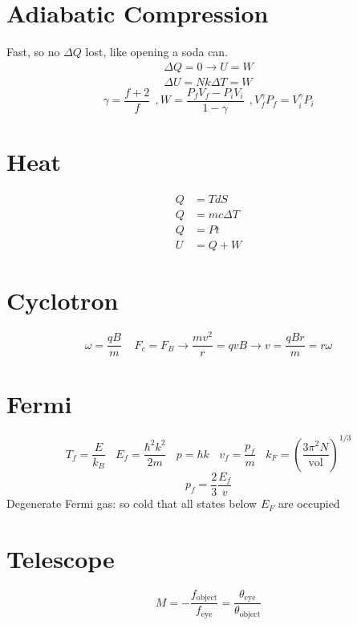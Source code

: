 \documentclass[10pt,letter]{article}
\begin{document}
\section{Adiabatic Compression} %
\label{sec:adiabatic_compression}
Fast, so no $\Delta Q$ lost, like opening a soda can.
\begin{align}
    \Delta Q = 0 \rightarrow U = W\\
    \Delta U = Nk \Delta T = W
\end{align}
\begin{equation}
    \gamma = \frac{f+2}{f}~~, W = \frac{P_fV_f - P_iV_i}{1-\gamma}~~,V_f^\gamma P_f = V_i^\gamma P_i
\end{equation}

\section{Heat} %
\label{sec:heat}
\begin{align}
Q &= TdS\\
Q &= mc \Delta T\\
Q &= Pt\\
U &= Q + W
\end{align}

\section{Cyclotron} %
\label{sec:cyclotron}
\begin{equation}
    \omega = \frac{qB}{m} ~~~~~ F_c = F_B \rightarrow \frac{mv^2}{r} = qvB \rightarrow v = \frac{qBr}{m} = r\omega
\end{equation}

\section{Fermi} %
\label{sec:fermi}
\begin{equation}
    T_f = \frac{E}{k_B}~~~~E_f = \frac{\hbar^2 k^2}{2m} ~~~~ p = \hbar k~~~~ v_f = \frac{p_f}{m}~~~~k_F = \left( \frac{3\pi^2N}{\textrm{vol}} \right) ^{1/3}
\end{equation}
\begin{equation}
    p_f = \frac{2}{3}\frac{E_f}{v}
\end{equation}
Degenerate Fermi gas: so cold that all states below $E_F$ are occupied

\section{Telescope} %
\label{sec:telescope}
\begin{equation}
    M = -\frac{f_\textrm{object}}{f_\textrm{eye}} = \frac{\theta_{\textrm{eye}}}{\theta_{\textrm{object}}}
\end{equation}
\end{document}
